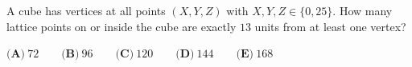 A cube has vertices at all points $(X,Y,Z)$ with $X,Y,Z\in\{0,25\}$. How many lattice points on or inside the cube are exactly $13$ units from at least one vertex?

$\textbf{(A)}\ 72\qquad\textbf{(B)}\ 96\qquad\textbf{(C)}\ 120\qquad\textbf{(D)}\ 144\qquad\textbf{(E)}\ 168$
